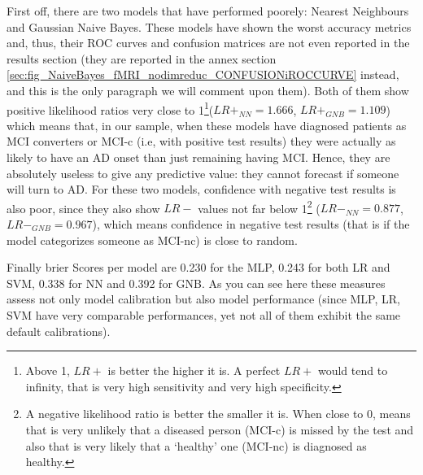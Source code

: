 \documentclass[a4paper,12pt]{elsarticle}  %
\begin{document}
		
		First off, there are two models that have performed poorely: Nearest Neighbours and Gaussian Naive Bayes. These models have shown the worst accuracy metrics and, thus, their ROC curves and confusion matrices are not even reported in the results section (they are reported in the annex section \ref{sec:fig_NaiveBayes_fMRI_nodimreduc_CONFUSIONiROCCURVE} instead, and this is the only paragraph we will comment upon them). Both of them show positive likelihood ratios very close to 1\footnote{Above 1, $LR+$ is better the higher it is. A perfect $LR+$ would tend to infinity, that is very high sensitivity and very high specificity.}($LR+_{NN} = 1.666$, $LR+_{GNB} = 1.109$) which means that, in our sample, when these models have diagnosed patients as MCI converters or MCI-c (i.e, with positive test results) they were actually as likely to have an AD onset than just remaining having MCI. Hence, they are absolutely useless to give any predictive value: they cannot forecast if someone will turn to AD. For these two models, confidence with negative test results is also poor, since they also show $LR-$ values not far below 1\footnote{A negative likelihood ratio is better the smaller it is. When close to 0, means that is very unlikely that a diseased person (MCI-c) is missed by the test and also that is very likely that a `healthy' one (MCI-nc) is diagnosed as healthy.} ($LR-_{NN} = 0.877$, $LR-_{GNB} = 0.967$), which means confidence in negative test results (that is if the model categorizes someone as MCI-nc) is close to random.  
		
		Finally brier Scores per model are 0.230 for the MLP, 0.243 for both LR and SVM, 0.338 for NN and 0.392 for GNB. As you can see here these measures assess not only model calibration but also model performance (since MLP, LR, SVM have very comparable performances, yet not all of them exhibit the same default calibrations).
\end{document}
